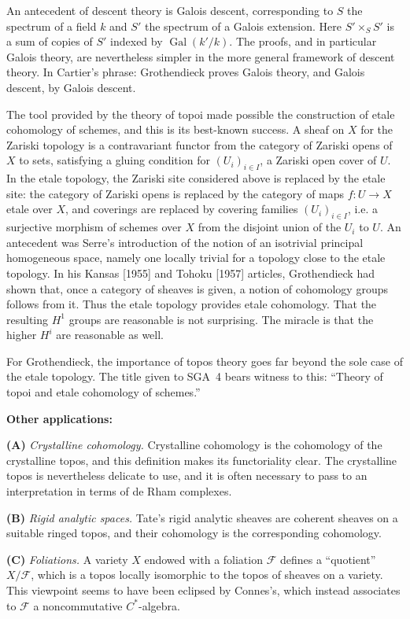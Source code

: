 \documentclass[11pt,a4paper]{article}
\theoremstyle{plain}
\theoremstyle{definition}
\DeclareMathOperator{\Gal}{Gal}
\begin{document}
An antecedent of descent theory is Galois descent, corresponding to $S$ the spectrum of a field $k$ and $S'$ the spectrum of a Galois extension. Here $S'\times_S S'$ is a sum of copies of $S'$ indexed by $\Gal(k'/k)$. The proofs, and in particular Galois theory, are nevertheless simpler in the more general framework of descent theory. In Cartier's phrase: Grothendieck proves Galois theory, and Galois descent, by Galois descent.

The tool provided by the theory of topoi made possible the construction of etale cohomology of schemes, and this is its best-known success. A sheaf on $X$ for the Zariski topology is a contravariant functor from the category of Zariski opens of $X$ to sets, satisfying a gluing condition for $(U_i)_{i\in I}$, a Zariski open cover of $U$. In the etale topology, the Zariski site considered above is replaced by the etale site: the category of Zariski opens is replaced by the category of maps $f:U\to X$ etale over $X$, and coverings are replaced by covering families $(U_i)_{i\in I}$, i.e. a surjective morphism of schemes over $X$ from the disjoint union of the $U_i$ to $U$. An antecedent was Serre's introduction of the notion of an isotrivial principal homogeneous space, namely one locally trivial for a topology close to the etale topology. In his Kansas [1955] and Tohoku [1957] articles, Grothendieck had shown that, once a category of sheaves is given, a notion of cohomology groups follows from it. Thus the etale topology provides etale cohomology. That the resulting $H^1$ groups are reasonable is not surprising. The miracle is that the higher $H^i$ are reasonable as well.

For Grothendieck, the importance of topos theory goes far beyond the sole case of the etale topology. The title given to SGA~4 bears witness to this: ``Theory of topoi and etale cohomology of schemes.''

\textbf{Other applications:}

\medskip
\textbf{(A)} \emph{Crystalline cohomology.} Crystalline cohomology is the cohomology of the crystalline topos, and this definition makes its functoriality clear. The crystalline topos is nevertheless delicate to use, and it is often necessary to pass to an interpretation in terms of de Rham complexes.

\textbf{(B)} \emph{Rigid analytic spaces.} Tate's rigid analytic sheaves are coherent sheaves on a suitable ringed topos, and their cohomology is the corresponding cohomology.

\textbf{(C)} \emph{Foliations.} A variety $X$ endowed with a foliation $\mathcal{F}$ defines a ``quotient'' $X/\mathcal{F}$, which is a topos locally isomorphic to the topos of sheaves on a variety. This viewpoint seems to have been eclipsed by Connes's, which instead associates to $\mathcal{F}$ a noncommutative $C^*$-algebra.
\end{document}
